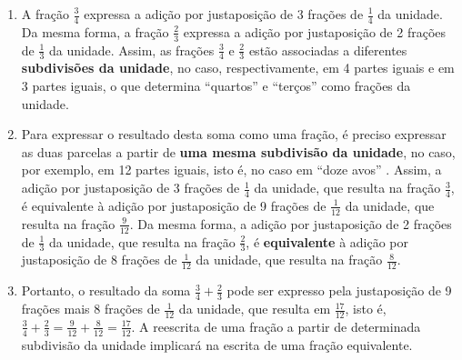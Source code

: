 \begin{enumerate} [\quad a)] %
    \item       A fração       $\frac{3}{4}$       expressa a adição por justaposição de 3 frações de       $\frac{1}{4}$       da unidade. Da mesma forma, a fração       $\frac{2}{3}$        expressa a adição por justaposição de 2 frações de       $\frac{1}{3}$       da unidade. Assim, as frações       $\frac{3}{4}$       e       $\frac{2}{3}$       estão associadas a diferentes       {\bf subdivisões da unidade}, no caso, respectivamente, em 4 partes iguais e em 3 partes iguais, o que determina       ``quartos''       e       ``terços''       como frações da unidade.
    \item       Para expressar o resultado desta soma como uma fração, é preciso expressar as duas parcelas a partir de       {\bf uma mesma subdivisão da unidade}, no caso, por exemplo, em 12 partes iguais, isto é, no caso em       ``doze avos''      . Assim, a adição por justaposição de 3 frações de       $\frac{1}{4}$       da unidade, que resulta na fração       $\frac{3}{4}$, é equivalente à adição por justaposição de 9 frações de       $\frac{1}{12}$       da unidade, que resulta na fração       $\frac{9}{12}$. Da mesma forma, a adição por justaposição de 2 frações de       $\frac{1}{3}$       da unidade, que resulta na fração       $\frac{2}{3}$, é       {\bf equivalente}       à adição por justaposição de 8 frações de       $\frac{1}{12}$       da unidade, que resulta na fração       $\frac{8}{12}$.
    \item       Portanto, o resultado da soma       $\frac{3}{4} + \frac{2}{3}$       pode ser expresso pela justaposição de 9 frações mais 8 frações de       $\frac{1}{12}$       da unidade, que resulta em       $\frac{17}{12}$, isto é,       $\frac{3}{4} + \frac{2}{3} = \frac{9}{12}+\frac{8}{12}=\frac{17}{12}$. A reescrita de uma fração a partir de determinada subdivisão da unidade implicará na escrita de uma fração equivalente.
\end{enumerate} %

